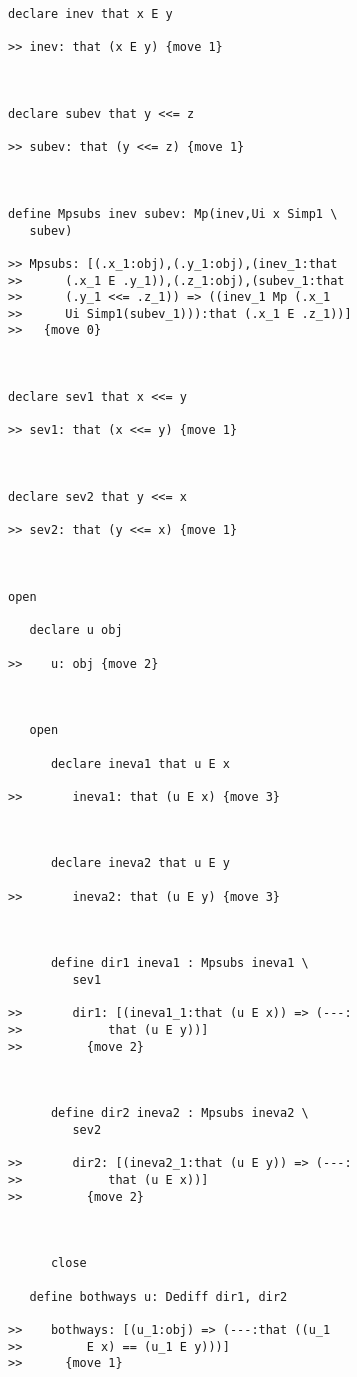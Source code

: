 \documentclass[12pt]{article}
\begin{document}
\begin{verbatim}
declare inev that x E y

>> inev: that (x E y) {move 1}



declare subev that y <<= z

>> subev: that (y <<= z) {move 1}



define Mpsubs inev subev: Mp(inev,Ui x Simp1 \
   subev)

>> Mpsubs: [(.x_1:obj),(.y_1:obj),(inev_1:that
>>      (.x_1 E .y_1)),(.z_1:obj),(subev_1:that
>>      (.y_1 <<= .z_1)) => ((inev_1 Mp (.x_1
>>      Ui Simp1(subev_1))):that (.x_1 E .z_1))]
>>   {move 0}



declare sev1 that x <<= y

>> sev1: that (x <<= y) {move 1}



declare sev2 that y <<= x

>> sev2: that (y <<= x) {move 1}



open

   declare u obj

>>    u: obj {move 2}



   open

      declare ineva1 that u E x

>>       ineva1: that (u E x) {move 3}



      declare ineva2 that u E y

>>       ineva2: that (u E y) {move 3}



      define dir1 ineva1 : Mpsubs ineva1 \
         sev1

>>       dir1: [(ineva1_1:that (u E x)) => (---:
>>            that (u E y))]
>>         {move 2}



      define dir2 ineva2 : Mpsubs ineva2 \
         sev2

>>       dir2: [(ineva2_1:that (u E y)) => (---:
>>            that (u E x))]
>>         {move 2}



      close

   define bothways u: Dediff dir1, dir2

>>    bothways: [(u_1:obj) => (---:that ((u_1
>>         E x) == (u_1 E y)))]
>>      {move 1}




\end{verbatim}
\end{document}
